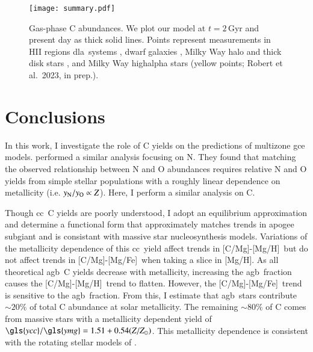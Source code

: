 \documentclass[12pt,oneside,letterpaper]{report}
\newcommand{\cc}{\gls{cc}}
\newcommand{\agb}{\gls{agb}}
\newcommand{\dla}{\gls{dla}}
\newcommand{\gce}{\gls{gce}}
\newcommand{\apogee}{\gls{apogee}}
\newcommand{\Ycc}{\gls{ycc}}
\newcommand{\Yoc}{\gls{ymg}}
\newcommand{\caah}{[C/Mg]-[Mg/H]}
\newcommand{\caafe}{[C/Mg]-[Mg/Fe]}
\newcommand{\citealtjack}{Robert et al.~2023, in prep.}
\newcommand{\about}[1]{${\sim} #1$}
\begin{document}
\begin{figure}[htp]
\centering
\texttt{[image: summary.pdf]}
\caption[Gas phase abundances]{Gas-phase C abundances. We plot our model at $t=2$\,Gyr and present day as thick solid lines. Points represent measurements in 
    HII regions    \citep[pink circles;][]{skillman+20, esteban+02, esteban+09, esteban+14, esteban+19}
    \dla\ systems \citep[blue triangles;][]{ellison+10, srianand+10, dutta+14, DZ+03, pettini+08, morrison+16,cooke+17},  %
    dwarf galaxies \citep[red diamonds;][]{berg+19},
    Milky Way halo and thick disk stars \citep[green stars;][]{nissen+14, fabbian+09},
    and Milky Way \gls{highalpha} stars (yellow points; \citealtjack).
}
\label{fig:gas_phase}
\end{figure}


\chapter{Conclusions}

In this work, I investigate the role of C yields on the predictions of \gls{multizone} \gce{} models. \citet{james+23} performed a similar analysis focusing on N. They found that matching the observed relationship between N and O abundances \citep{HEK00,PVT10,berg+12, berg+20, skillman+20, izotov+12, james2+15, dopita+16} requires relative N and O yields from simple stellar populations with a roughly linear dependence on metallicity (i.e. $y_{\rm N}/y_{\rm O} \propto Z$). 
Here, I perform a similar analysis on C. 

Though \cc\ C yields are poorly understood, I adopt an equilibrium approximation and determine a functional form that approximately matches trends in \apogee{} \gls{subgiant} and is consistant with massive star \gls{nucleosynthesis} models. Variations of the metallicity dependence of this \cc\ yield affect trends in \caah~but do not affect trends in \caafe\ when taking a slice in [Mg/H]. As all theoretical \agb\ C yields decrease with metallicity, increasing the \agb\ fraction causes the \caah\ trend to flatten. However, the \caafe\ trend is sensitive to the \agb\ fraction. 
From this, I estimate that \agb\ stars contribute \about{20\%} of total C abundance at solar metallicity. The remaining \about{80\%} of C comes from massive stars with a metallicity dependent yield of $\Ycc/\Yoc=1.51 + 0.54 (Z/Z_\odot)$. 
This metallicity dependence is consistent with the rotating stellar models of \citet{LC18}. 
 
\end{document}
